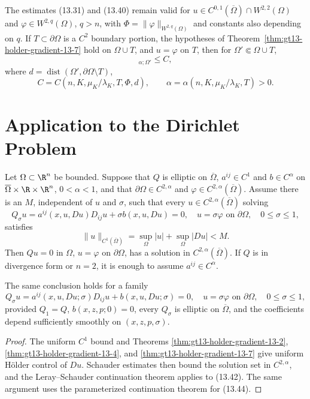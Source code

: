 The estimates \textup{(13.31)} and \textup{(13.40)} remain valid for
$u\in C^{0,1}(\overline\Omega)\cap W^{2,2}(\Omega)$ and
$\varphi\in W^{2,q}(\Omega)$, $q>n$, with
$\Phi=\|\varphi\|_{W^{2,q}(\Omega)}$ and constants also depending on $q$.
If $T\subset\partial\Omega$ is a $C^2$ boundary portion, the hypotheses of
Theorem~\ref{thm:gt13-holder-gradient-13-7} hold on $\Omega\cup T$, and
$u=\varphi$ on $T$, then for $\Omega'\Subset\Omega\cup T$,
\begin{equation}
[Du]_{\alpha;\Omega'}\le C,
\tag{13.41}
\end{equation}
where $d=\operatorname{dist}(\Omega',\partial\Omega\setminus T)$,
\[
C=C(n,K,\mu_K/\lambda_K,T,\Phi,d),
\qquad
\alpha=\alpha(n,K,\mu_K/\lambda_K,T)>0.
\]

\section{Application to the Dirichlet Problem}

\begin{theorem}
\label{thm:gt13-holder-gradient-13-8}
Let $\Omega\subset\R^n$ be bounded.  Suppose that $Q$ is elliptic on
$\overline\Omega$, $a^{ij}\in C^1$ and $b\in C^\alpha$ on
$\overline\Omega\times\R\times\R^n$, $0<\alpha<1$, and that
$\partial\Omega\in C^{2,\alpha}$ and
$\varphi\in C^{2,\alpha}(\overline\Omega)$.  Assume there is an $M$,
independent of $u$ and $\sigma$, such that every
$u\in C^{2,\alpha}(\overline\Omega)$ solving
\begin{equation}
Q_\sigma u=a^{ij}(x,u,Du)D_{ij}u+\sigma b(x,u,Du)=0,
\quad u=\sigma\varphi\text{ on }\partial\Omega,\quad 0\le\sigma\le1,
\tag{13.42}
\end{equation}
satisfies
\begin{equation}
\|u\|_{C^1(\overline\Omega)}
=\sup_\Omega|u|+\sup_\Omega|Du|<M.
\tag{13.43}
\end{equation}
Then $Qu=0$ in $\Omega$, $u=\varphi$ on $\partial\Omega$, has a solution
in $C^{2,\alpha}(\overline\Omega)$.  If $Q$ is in divergence form or
$n=2$, it is enough to assume $a^{ij}\in C^\alpha$.

The same conclusion holds for a family
\begin{equation}
Q_\sigma u=a^{ij}(x,u,Du;\sigma)D_{ij}u+b(x,u,Du;\sigma)=0,
\quad u=\sigma\varphi\text{ on }\partial\Omega,\quad 0\le\sigma\le1,
\tag{13.44}
\end{equation}
provided $Q_1=Q$, $b(x,z,p;0)=0$, every $Q_\sigma$ is elliptic on
$\overline\Omega$, and the coefficients depend sufficiently smoothly on
$(x,z,p,\sigma)$.
\end{theorem}
\begin{proof}
\sketch The uniform $C^1$ bound and Theorems
\ref{thm:gt13-holder-gradient-13-2},
\ref{thm:gt13-holder-gradient-13-4}, and
\ref{thm:gt13-holder-gradient-13-7} give uniform H\"older control of $Du$.
Schauder estimates then bound the solution set in $C^{2,\alpha}$, and the
Leray--Schauder continuation theorem applies to \textup{(13.42)}.  The same
argument uses the parameterized continuation theorem for \textup{(13.44)}.
\end{proof}
